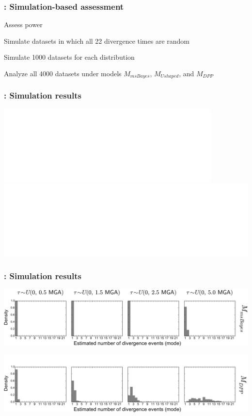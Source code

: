 \begin{frame}
    \frametitle{\dppmsbayes: Simulation-based assessment}
    Assess power \\
    \smallskip
    \begin{myitemize}
        \item Simulate datasets in which all 22 divergence times are random
        \item Simulate 1000 datasets for each \divTime{} distribution
        \item Analyze all 4000 datasets under models $M_{msBayes}$, $M_{Ushaped}$, and $M_{DPP}$
    \end{myitemize}
\end{frame}

\begin{frame}
    \frametitle{\dppmsbayes: Simulation results}
    \centerline{
        \includegraphics<1>[width=0.85\textwidth]{../images/validation-model-choice-old-dpp.pdf}
        \includegraphics<2>[width=1.13\textwidth]{../images/validation-model-choice-old-dpp-full.pdf}}
\end{frame}

\begin{frame}[t]
    \frametitle{\dppmsbayes: Simulation results}
    \vspace{1cm}
        \centerline{
        \includegraphics[width=1.13\textwidth]{../images/old_old_power_psi_mode.pdf}}
        \vspace{0mm}
        \centerline{
        \includegraphics[width=1.13\textwidth]{../images/old_dpp_power_psi_mode_headless.pdf}}
\end{frame}

